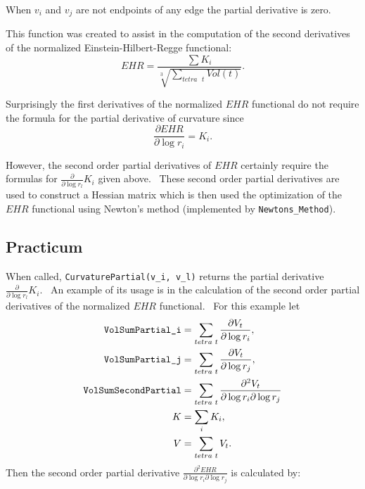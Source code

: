 When $v_{i}$ and $v_{j}$ are not endpoints of any edge the partial
derivative is zero. \ 

This function was created to assist in the computation of the second
derivatives of the normalized Einstein-Hilbert-Regge functional:%
\begin{equation*}
EHR=\frac{\sum K_{i}}{\sqrt[3]{\sum\limits_{tetra\text{ }t}Vol(t)}}.
\end{equation*}

Surprisingly the first derivatives of the normalized $EHR$ functional do not
require the formula for the partial derivative of curvature since 
\begin{equation*}
\frac{\partial EHR}{\partial\log r_{i}}=K_{i}.
\end{equation*}

However, the second order partial derivatives of $EHR$ certainly require the
formulas for $\frac{\partial}{\partial\log r_{l}}K_{i}$ given above. \ These
second order partial derivatives are used to construct a Hessian matrix
which is then used the optimization of the $EHR$ functional using Newton's
method (implemented by \texttt{Newtons\_Method}).

\subsection*{Practicum}

When called, \texttt{CurvaturePartial(v\_i, v\_l)} returns the partial
derivative $\frac{\partial }{\partial \log r_{l}}K_{i}$. \ An example of its
usage is in the calculation of the second order partial derivatives of the
normalized $EHR$ functional. \ For this example let 
\begin{align*}
\text{\texttt{VolSumPartial\_i}}& =\sum_{tetra\text{ }t}\frac{\partial V_{t}%
}{\partial \log r_{i}}, \\
\text{\texttt{VolSumPartial\_j}}& =\sum_{tetra\text{ }t}\frac{\partial V_{t}%
}{\partial \log r_{j}}, \\
\text{\texttt{VolSumSecondPartial}}& =\sum_{tetra\text{ }t}\frac{\partial
^{2}V_{t}}{\partial \log r_{i}\partial \log r_{j}} \\
K& =\sum_{i}K_{i}, \\
V& =\sum_{tetra\text{ }t}V_{t}.
\end{align*}%
Then the second order partial derivative $\frac{\partial ^{2}EHR}{\partial
\log r_{i}\partial \log r_{j}}$ is calculated by:

\bigskip


